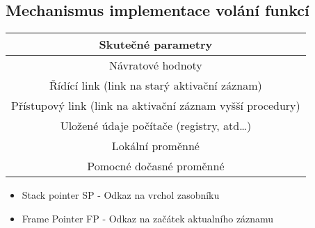 \documentclass{szzclass}
\begin{document}
\subsection{Mechanismus implementace volání funkcí}
\begin{center}
\def\arraystretch{2}
\begin{tabular}{|c|} \hline
Skutečné parametry \\ \hline
Návratové hodnoty \\ \hline
\rowcolor{lightgray} Řídící link (link na starý aktivační záznam) \\ \hline
Přístupový link (link na aktivační záznam vyšší procedury) \\ \hline
\rowcolor{lightgray} Uložené údaje počítače (registry, atd\dots) \\ \hline
Lokální proměnné \\ \hline
Pomocné dočasné proměnné \\ \hline
\end{tabular}
\end{center}

\begin{itemize}
\item Stack pointer SP - Odkaz na vrchol zasobníku
\item Frame Pointer FP - Odkaz na začátek aktualního záznamu
\end{itemize}
\end{document}
